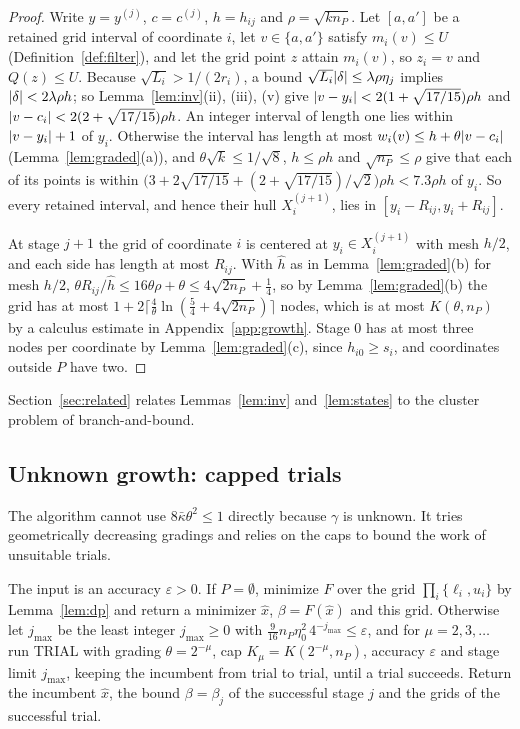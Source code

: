 \begin{proof}
Write $y=y^{(j)}$, $c=c^{(j)}$, $h=h_{ij}$ and $\rho=\sqrt{kn_P}$. Let
$[a,a']$ be a retained grid interval of coordinate $i$, let
$v\in\{a,a'\}$ satisfy $m_i(v)\le U$ (Definition~\ref{def:filter}), and let
the grid point $z$ attain $m_i(v)$, so $z_i=v$ and $Q(z)\le U$. Because
$\sqrt{L_i}>1/(2r_i)$, a bound $\sqrt{L_i}\lvert \delta\rvert\le\lambda\rho\eta_j$
implies $\lvert \delta\rvert<2\lambda\rho h$; so Lemma~\ref{lem:inv}(ii), (iii), (v)
give $\lvert v-y_i\rvert<2(1+\sqrt{17/15})\rho h$ and
$\lvert v-c_i\rvert<2(2+\sqrt{17/15})\rho h$. An integer interval of length one
lies within $\lvert v-y_i\rvert+1$ of $y_i$. Otherwise the interval has length at
most $w_i(v)\le h+\theta\lvert v-c_i\rvert$ (Lemma~\ref{lem:graded}(a)), and
$\theta\sqrt k\le1/\sqrt8$, $h\le\rho h$ and $\sqrt{n_P}\le\rho$ give that
each of its points is within
$\bigl(3+2\sqrt{17/15}+(2+\sqrt{17/15})/\sqrt2\bigr)\rho h<7.3\rho h$ of
$y_i$. So every retained interval, and hence their hull $X_i^{(j+1)}$, lies
in $[y_i-R_{ij},y_i+R_{ij}]$.

At stage $j+1$ the grid of coordinate $i$ is centered at
$y_i\in X_i^{(j+1)}$ with mesh $h/2$, and each side has length at most
$R_{ij}$. With $\hat h$ as in Lemma~\ref{lem:graded}(b) for mesh $h/2$,
$\theta R_{ij}/\hat h\le16\theta\rho+\theta\le4\sqrt{2n_P}+\frac14$, so by
Lemma~\ref{lem:graded}(b) the grid has at most
$1+2\lceil\frac4\theta\ln(\frac54+4\sqrt{2n_P})\rceil$ nodes, which is at
most $K(\theta,n_P)$ by a calculus estimate in Appendix~\ref{app:growth}.
Stage $0$ has at most three nodes per
coordinate by Lemma~\ref{lem:graded}(c), since $h_{i0}\ge s_i$, and
coordinates outside $P$ have two.
\end{proof}

Section~\ref{sec:related} relates Lemmas~\ref{lem:inv} and~\ref{lem:states}
to the cluster problem of branch-and-bound.

\subsection{Unknown growth: capped trials}
The algorithm cannot use $8\bar\kappa\theta^2\le1$ directly because $\gamma$
is unknown. It tries geometrically decreasing gradings and relies on the caps
to bound the work of unsuitable trials.

\begin{algorithm}\label{alg:ct}
The input is an accuracy $\varepsilon>0$. If $P=\emptyset$, minimize $F$
over the grid $\prod_i\{\ell_i,u_i\}$ by Lemma~\ref{lem:dp} and return a
minimizer $\hat x$, $\beta=F(\hat x)$ and this grid. Otherwise let
$j_{\max}$ be the least integer $j_{\max}\ge0$ with
$\frac9{16}n_P\eta_0^2\,4^{-j_{\max}}\le\varepsilon$, and for
$\mu=2,3,\dots$ run TRIAL with grading $\theta=2^{-\mu}$, cap
$K_\mu=K(2^{-\mu},n_P)$, accuracy $\varepsilon$ and stage limit $j_{\max}$,
keeping the incumbent from trial to trial, until a trial succeeds. Return the
incumbent $\hat x$, the bound $\beta=\beta_j$ of the successful stage $j$ and
the grids of the successful trial.
\end{algorithm}

